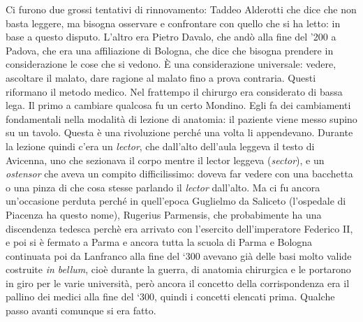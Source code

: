 \documentclass[]{article}
\begin{document}
Ci furono due grossi tentativi di rinnovamento: Taddeo Alderotti che
dice che non basta leggere, ma bisogna osservare e confrontare con
quello che si ha letto: in base a questo disputo. L'altro era Pietro
Davalo, che andò alla fine del '200 a Padova, che era una affiliazione
di Bologna, che dice che bisogna prendere in considerazione le cose che
si vedono. È una considerazione universale: vedere, ascoltare il malato,
dare ragione al malato fino a prova contraria. Questi riformano il
metodo medico. Nel frattempo il chirurgo era considerato di bassa lega.
Il primo a cambiare qualcosa fu un certo Mondino. Egli fa dei
cambiamenti fondamentali nella modalità di lezione di anatomia: il
paziente viene messo supino su un tavolo. Questa è una rivoluzione
perché una volta li appendevano. Durante la lezione quindi c'era un
\emph{lector}, che dall'alto dell'aula leggeva il testo di Avicenna, uno
che sezionava il corpo mentre il lector leggeva (\emph{sector}), e un
\emph{ostensor} che aveva un compito difficilissimo: doveva far vedere
con una bacchetta o una pinza di che cosa stesse parlando il
\emph{lector} dall'alto. Ma ci fu ancora un'occasione perduta perché in
quell'epoca Guglielmo da Saliceto (l'ospedale di Piacenza ha questo
nome), Rugerius Parmensis, che probabimente ha una discendenza tedesca
perchè era arrivato con l'esercito dell'imperatore Federico II, e poi si
è fermato a Parma e ancora tutta la scuola di Parma e Bologna continuata
poi da Lanfranco alla fine del `300 avevano già delle basi molto valide
costruite \emph{in bellum}, cioè durante la guerra, di anatomia
chirurgica e le portarono in giro per le varie università, però ancora
il concetto della corrispondenza era il pallino dei medici alla fine del
`300, quindi i concetti elencati prima. Qualche passo avanti comunque si
era fatto.
\end{document}
